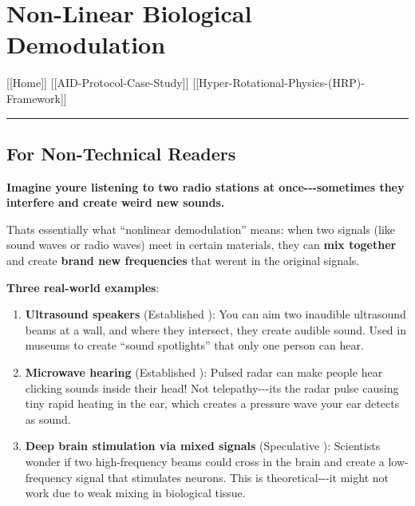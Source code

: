 \section{Non-Linear Biological
Demodulation}\label{non-linear-biological-demodulation}

{[}{[}Home{]}{]} \textbar{} {[}{[}AID-Protocol-Case-Study{]}{]}
\textbar{} {[}{[}Hyper-Rotational-Physics-(HRP)-Framework{]}{]}

\begin{center}\rule{0.5\linewidth}{0.5pt}\end{center}

\subsection{\texorpdfstring{ For Non-Technical
Readers}{ For Non-Technical Readers}}\label{for-non-technical-readers}

\textbf{Imagine you\textquotesingle re listening to two radio stations
at once-\/-\/-sometimes they interfere and create weird new sounds.}

That\textquotesingle s essentially what ``nonlinear demodulation''
means: when two signals (like sound waves or radio waves) meet in
certain materials, they can \textbf{mix together} and create
\textbf{brand new frequencies} that weren\textquotesingle t in the
original signals.

\textbf{Three real-world examples}:

\begin{enumerate}
\def\labelenumi{\arabic{enumi}.}
\item
  \textbf{Ultrasound speakers} (Established ): You can aim two inaudible
  ultrasound beams at a wall, and where they intersect, they create
  audible sound. Used in museums to create ``sound spotlights'' that
  only one person can hear.
\item
  \textbf{Microwave hearing} (Established ): Pulsed radar can make
  people hear clicking sounds inside their head! Not
  telepathy-\/-\/-it\textquotesingle s the radar pulse causing tiny
  rapid heating in the ear, which creates a pressure wave your ear
  detects as sound.
\item
  \textbf{Deep brain stimulation via mixed signals} (Speculative ):
  Scientists wonder if two high-frequency beams could cross in the brain
  and create a low-frequency signal that stimulates neurons. This is
  theoretical-\/-\/-it might not work due to weak mixing in biological
  tissue.
\end{enumerate}


